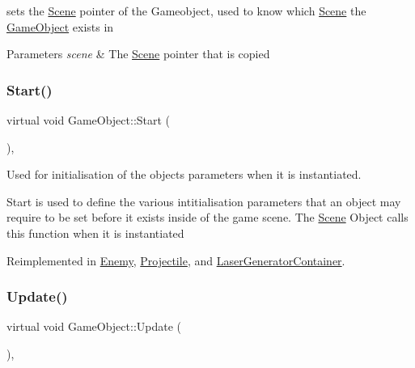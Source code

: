 sets the \hyperlink{class_scene}{Scene} pointer of the Gameobject, used to know which \hyperlink{class_scene}{Scene} the \hyperlink{class_game_object}{Game\+Object} exists in 


\begin{DoxyParams}{Parameters}
{\em scene} & The \hyperlink{class_scene}{Scene} pointer that is copied \\
\hline
\end{DoxyParams}
\mbox{\label{class_game_object_aeeb2162f2779e5591a372a1568bc5c68}} 
\subsubsection{\texorpdfstring{Start()}{Start()}}
{\footnotesize\ttfamily virtual void Game\+Object\+::\+Start (\begin{DoxyParamCaption}{ }\end{DoxyParamCaption})\hspace{0.3cm}{\ttfamily [inline]}, {\ttfamily [virtual]}}



Used for initialisation of the objects parameters when it is instantiated. 

Start is used to define the various intitialisation parameters that an object may require to be set before it exists inside of the game scene. The \hyperlink{class_scene}{Scene} Object calls this function when it is instantiated 

Reimplemented in \hyperlink{class_enemy_a64ee0cc6fb8a3424d486537efb8205d8}{Enemy}, \hyperlink{class_projectile_a27a59059730a66a37feec766ebe08fa2}{Projectile}, and \hyperlink{class_laser_generator_container_a9fc676b255f742a97ec0eb6036491684}{Laser\+Generator\+Container}.

\mbox{\label{class_game_object_ac7ecc123dacaba955077420caabf5e64}} 
\subsubsection{\texorpdfstring{Update()}{Update()}}
{\footnotesize\ttfamily virtual void Game\+Object\+::\+Update (\begin{DoxyParamCaption}{ }\end{DoxyParamCaption})\hspace{0.3cm}{\ttfamily [inline]}, {\ttfamily [virtual]}}



